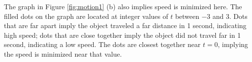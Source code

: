 {\begin{enumerate}
	The graph in Figure \ref{fig:motion1} (b) also implies speed is minimized here. The filled dots on the graph are located at integer values of $t$ between $-3$ and 3. Dots that are far apart imply the object traveled a far distance in 1 second, indicating high speed; dots that are close together imply the object did not travel far in 1 second, indicating a low speed. The dots are closest together near $t=0$, implying the speed is minimized near that value.
\end{enumerate}
\baselineskip
}\\

